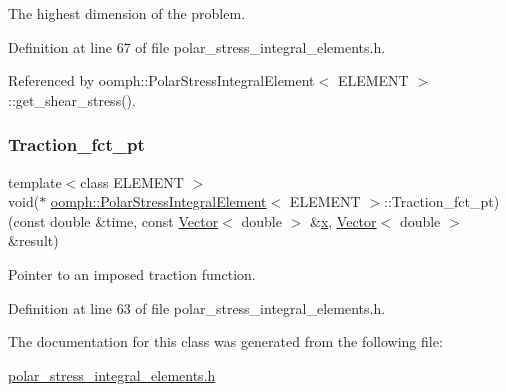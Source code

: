 The highest dimension of the problem. 



Definition at line 67 of file polar\+\_\+stress\+\_\+integral\+\_\+elements.\+h.



Referenced by oomph\+::\+Polar\+Stress\+Integral\+Element$<$ E\+L\+E\+M\+E\+N\+T $>$\+::get\+\_\+shear\+\_\+stress().

\mbox{\label{classoomph_1_1PolarStressIntegralElement_a481b846bd88c323325eb64cc9b77eaa1}} 
\subsubsection{\texorpdfstring{Traction\+\_\+fct\+\_\+pt}{Traction\_fct\_pt}}
{\footnotesize\ttfamily template$<$class E\+L\+E\+M\+E\+NT $>$ \\
void($\ast$ \hyperlink{classoomph_1_1PolarStressIntegralElement}{oomph\+::\+Polar\+Stress\+Integral\+Element}$<$ E\+L\+E\+M\+E\+NT $>$\+::Traction\+\_\+fct\+\_\+pt) (const double \&time, const \hyperlink{classoomph_1_1Vector}{Vector}$<$ double $>$ \&\hyperlink{classoomph_1_1PolarStressIntegralElement_accc1886b4e4d60b19046e11484e5d09d}{x}, \hyperlink{classoomph_1_1Vector}{Vector}$<$ double $>$ \&result)\hspace{0.3cm}{\ttfamily [private]}}



Pointer to an imposed traction function. 



Definition at line 63 of file polar\+\_\+stress\+\_\+integral\+\_\+elements.\+h.



The documentation for this class was generated from the following file\+:\begin{DoxyCompactItemize}
\item 
\hyperlink{polar__stress__integral__elements_8h}{polar\+\_\+stress\+\_\+integral\+\_\+elements.\+h}\end{DoxyCompactItemize}
